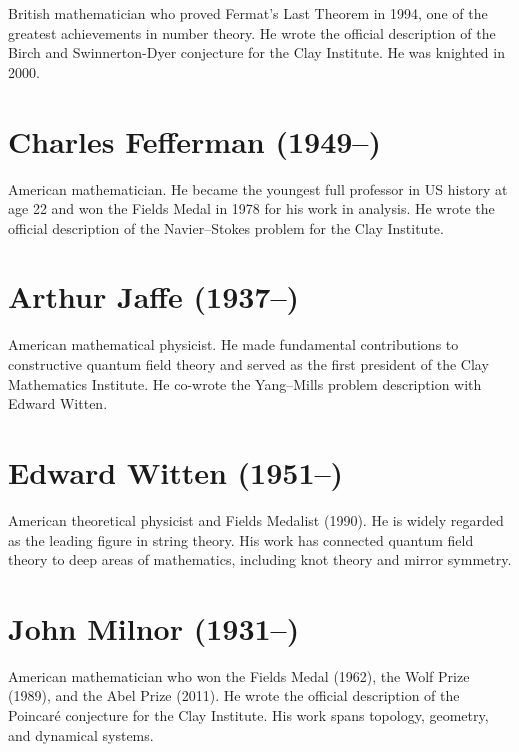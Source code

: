British mathematician who proved Fermat's Last Theorem in 1994, one of the greatest achievements in number theory. He wrote the official description of the Birch and Swinnerton-Dyer conjecture for the Clay Institute. He was knighted in 2000.

\section*{Charles Fefferman (1949--)}

American mathematician. He became the youngest full professor in US history at age 22 and won the Fields Medal in 1978 for his work in analysis. He wrote the official description of the Navier--Stokes problem for the Clay Institute.

\section*{Arthur Jaffe (1937--)}

American mathematical physicist. He made fundamental contributions to constructive quantum field theory and served as the first president of the Clay Mathematics Institute. He co-wrote the Yang--Mills problem description with Edward Witten.

\section*{Edward Witten (1951--)}

American theoretical physicist and Fields Medalist (1990). He is widely regarded as the leading figure in string theory. His work has connected quantum field theory to deep areas of mathematics, including knot theory and mirror symmetry.

\section*{John Milnor (1931--)}

American mathematician who won the Fields Medal (1962), the Wolf Prize (1989), and the Abel Prize (2011). He wrote the official description of the Poincar\'{e} conjecture for the Clay Institute. His work spans topology, geometry, and dynamical systems.
